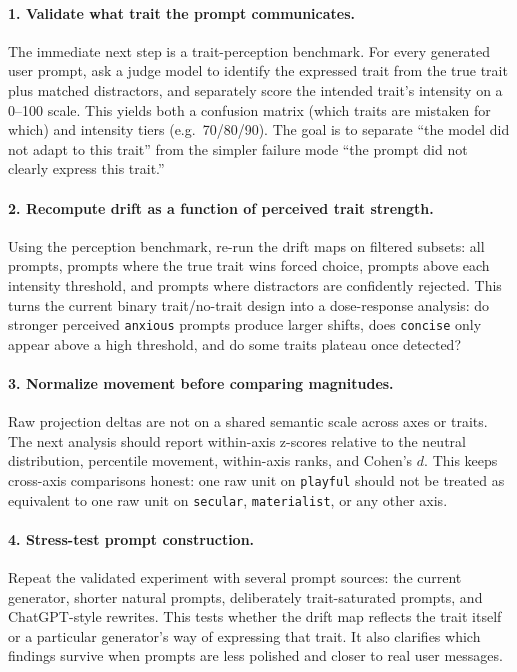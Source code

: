 \documentclass{article}
\newcommand{\ax}[1]{\texttt{#1}}   %
\begin{document}
\paragraph{1. Validate what trait the prompt communicates.}
The immediate next step is a trait-perception benchmark. For every generated user prompt, ask a judge model to identify the expressed trait from the true trait plus matched distractors, and separately score the intended trait's intensity on a 0--100 scale. This yields both a confusion matrix (which traits are mistaken for which) and intensity tiers (e.g.\ 70/80/90). The goal is to separate ``the model did not adapt to this trait'' from the simpler failure mode ``the prompt did not clearly express this trait.''

\paragraph{2. Recompute drift as a function of perceived trait strength.}
Using the perception benchmark, re-run the drift maps on filtered subsets: all prompts, prompts where the true trait wins forced choice, prompts above each intensity threshold, and prompts where distractors are confidently rejected. This turns the current binary trait/no-trait design into a dose-response analysis: do stronger perceived \ax{anxious} prompts produce larger shifts, does \ax{concise} only appear above a high threshold, and do some traits plateau once detected?

\paragraph{3. Normalize movement before comparing magnitudes.}
Raw projection deltas are not on a shared semantic scale across axes or traits. The next analysis should report within-axis z-scores relative to the neutral distribution, percentile movement, within-axis ranks, and Cohen's $d$. This keeps cross-axis comparisons honest: one raw unit on \ax{playful} should not be treated as equivalent to one raw unit on \ax{secular}, \ax{materialist}, or any other axis.

\paragraph{4. Stress-test prompt construction.}
Repeat the validated experiment with several prompt sources: the current generator, shorter natural prompts, deliberately trait-saturated prompts, and ChatGPT-style rewrites. This tests whether the drift map reflects the trait itself or a particular generator's way of expressing that trait. It also clarifies which findings survive when prompts are less polished and closer to real user messages.
\end{document}
